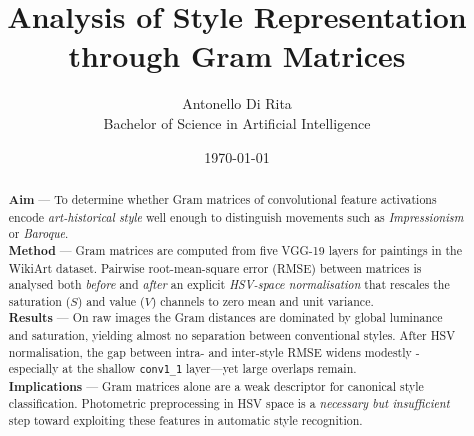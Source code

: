 \documentclass[a4paper,11pt]{article}
\begin{document}
\title{Analysis of Style Representation through Gram Matrices}
\author{Antonello Di Rita \\ Bachelor of Science in Artificial Intelligence}
\date{\today}
\maketitle

\begin{abstract}
\textbf{Aim} — To determine whether Gram matrices of convolutional feature activations encode \emph{art-historical style} well enough to distinguish movements such as \emph{Impressionism} or \emph{Baroque}.\\[2pt]
\textbf{Method} — Gram matrices are computed from five VGG-19 layers for paintings in the WikiArt dataset.  Pairwise root-mean-square error (RMSE) between matrices is analysed both \emph{before} and \emph{after} an explicit \emph{HSV-space normalisation} that rescales the saturation (\(S\)) and value (\(V\)) channels to zero mean and unit variance.\\[2pt]
\textbf{Results} — On raw images the Gram distances are dominated by global luminance and saturation, yielding almost no separation between conventional styles. After HSV normalisation, the gap between intra- and inter-style RMSE widens modestly - especially at the shallow \texttt{conv1\_1} layer—yet large overlaps remain.\\[2pt]
\textbf{Implications} — Gram matrices alone are a weak descriptor for canonical style classification.  Photometric preprocessing in HSV space is a \emph{necessary but insufficient} step toward exploiting these features in automatic style recognition.
\end{abstract}

\tableofcontents
\newpage
\end{document}
